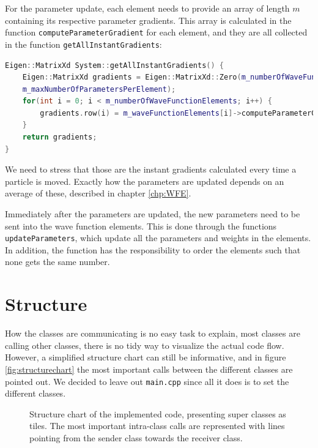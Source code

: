 For the parameter update, each element needs to provide an array of length $m$ containing its respective parameter gradients. This array is calculated in the function \newline \lstinline{computeParameterGradient} for each element, and they are all collected in the function \lstinline{getAllInstantGradients}:

\lstset{basicstyle=\scriptsize}
\begin{lstlisting}[language=c++,caption={from \lstinline{system.cpp}}]
Eigen::MatrixXd System::getAllInstantGradients() {
    Eigen::MatrixXd gradients = Eigen::MatrixXd::Zero(m_numberOfWaveFunctionElements, \
    m_maxNumberOfParametersPerElement);
    for(int i = 0; i < m_numberOfWaveFunctionElements; i++) {
        gradients.row(i) = m_waveFunctionElements[i]->computeParameterGradient();
    }
    return gradients;
}
\end{lstlisting}
We need to stress that those are the instant gradients calculated every time a particle is moved. Exactly how the parameters are updated depends on an average of these, described in chapter \ref{chp:WFE}. 

Immediately after the parameters are updated, the new parameters need to be sent into the wave function elements. This is done through the functions \lstinline{updateParameters}, which update all the parameters and weights in the elements. In addition, the function has the responsibility to order the elements such that none gets the same number. 


\section{Structure} \label{subsec:structure}
How the classes are communicating is no easy task to explain, most classes are calling other classes, there is no tidy way to visualize the actual code flow. However, a simplified structure chart can still be informative, and in figure \eqref{fig:structurechart} the most important calls between the different classes are pointed out. We decided to leave out \lstinline{main.cpp} since all it does is to set the different classes. 

\begin{figure} [h]
	\centering
	\label{fig:structurechart}
	
	\caption{Structure chart of the implemented code, presenting super classes as tiles. The most important intra-class calls are represented with lines pointing from the sender class towards the receiver class.}
\end{figure}

